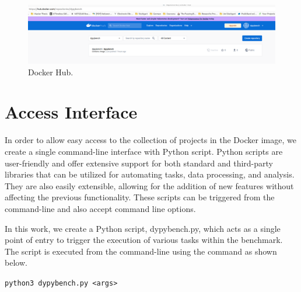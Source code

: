 \begin{figure}[ht]
\centering
\includegraphics[width=1\linewidth]{figures/implementation/docker_hub.png}
\caption[DyPyBench Docker Hub]{\label{fig:dypybench docker}Docker Hub.}
\end{figure}

\section{Access Interface}
\label{impl:Access Interface}
In order to allow easy access to the collection of projects in the Docker image, we create a single command-line interface with Python script.
Python scripts are user-friendly and offer extensive support for both standard and third-party libraries that can be utilized for automating tasks, data processing, and analysis.
They are also easily extensible, allowing for the addition of new features without affecting the previous functionality.
These scripts can be triggered from the command-line and also accept command line options.

In this work, we create a Python script, dypybench.py, which acts as a single point of entry to trigger the execution of various tasks within the benchmark.
The script is executed from the command-line using the command as shown below.

\verb$python3 dypybench.py <args>$

